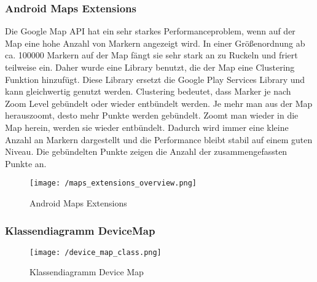 \subsubsection{Android Maps Extensions}

Die Google Map API hat ein sehr starkes Performanceproblem, wenn auf der Map eine hohe Anzahl von Markern angezeigt wird. In einer Größenordnung ab ca. 100000 Markern auf der Map fängt sie sehr stark an zu Ruckeln und friert teilweise ein. Daher wurde eine Library benutzt, die der Map eine Clustering Funktion hinzufügt. Diese Library ersetzt die Google Play Services Library und kann gleichwertig genutzt werden. Clustering bedeutet, dass Marker je nach Zoom Level gebündelt oder wieder entbündelt werden. Je mehr man aus der Map herauszoomt, desto mehr Punkte werden gebündelt. Zoomt man wieder in die Map herein, werden sie wieder entbündelt. Dadurch wird immer eine kleine Anzahl an Markern dargestellt und die Performance bleibt stabil auf einem guten Niveau. Die gebündelten Punkte zeigen die Anzahl der zusammengefassten Punkte an.

\begin{figure}[H]
\centering
\texttt{[image: /maps\_extensions\_overview.png]}
\caption[User Interface: Android Maps Extensions]{Android Maps Extensions}
\label{fig:mapsExtensions}
\end{figure}

\subsubsection{Klassendiagramm DeviceMap}
\begin{figure}[H]
\centering
\texttt{[image: /device\_map\_class.png]}
\caption[User Interface: Klassendiagramm Device Map]{Klassendiagramm Device Map}
\label{fig:deviceMapClass}
\end{figure}

